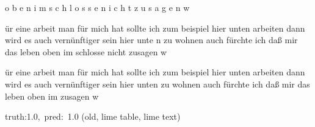 \documentclass[a4paper,10pt,twoside]{article}
\begin{document}
{\color[rgb]{0.203,0,0} o}{\color[rgb]{0.209,0,0} b}{\color[rgb]{0.13,0,0} e}{\color[rgb]{0.117,0,0} n} {\color[rgb]{0.162,0,0} i}{\color[rgb]{1,0,0} m} {\color[rgb]{1,0,0} s}{\color[rgb]{1,0,0} c}{\color[rgb]{0.354,0,0} h}{\color[rgb]{1,0,0} l}{\color[rgb]{1,0,0} o}{\color[rgb]{0.0,0,0} s}{\color[rgb]{1,0,0} s}{\color[rgb]{0.332,0,0} e} {\color[rgb]{1,0,0} n}{\color[rgb]{1,0,0} i}{\color[rgb]{1,0,0} c}{\color[rgb]{1,0,0} h}{\color[rgb]{1,0,0} t} {\color[rgb]{0.0,0,0} z}{\color[rgb]{1,0,0} u}{\color[rgb]{1,0,0} s}{\color[rgb]{1,0,0} a}{\color[rgb]{1,0,0} g}{\color[rgb]{1,0,0} e}{\color[rgb]{1,0,0} n} {\color[rgb]{0.0,0,0} w}

ür eine arbeit man für mich hat sollte ich zum beispiel hier unten arbeiten dann wird es auch vernünftiger sein hier unte{\color[rgb]{1,0,0} n} zu wohnen auch fürchte ich daß mir {\color[rgb]{1,0,0} d}as leben oben im schlosse {\color[rgb]{1,0,0} n}icht zusagen w

 ür eine arbeit man für mich {\color[rgb]{1,0,0} hat} sollte {\color[rgb]{1,0,0} ich} zum {\color[rgb]{0,0,1} beispiel} hier unten arbeiten dann wird es auch vernünftiger sein hier unten zu wohnen auch fürchte {\color[rgb]{1,0,0} ich} daß mir das leben oben im   zusagen w

 {\footnotesize {\color[rgb]{0.6, 0.6, 0.6}truth:1.0,~pred:~1.0}} (old, lime table, lime text)\hrulefill
\end{document}
